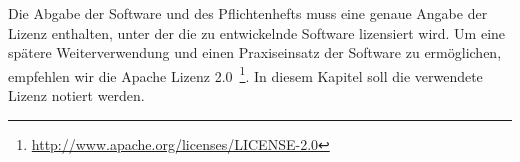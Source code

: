 \begin{tcolorbox}
Die Abgabe der Software und des Pflichtenhefts muss eine genaue Angabe der Lizenz enthalten, unter der die zu entwickelnde Software lizensiert wird.
Um eine spätere Weiterverwendung und einen Praxiseinsatz der Software zu ermöglichen, empfehlen wir die Apache Lizenz 2.0~\footnote{\url{http://www.apache.org/licenses/LICENSE-2.0}}.
In diesem Kapitel soll die verwendete Lizenz notiert werden.
\end{tcolorbox}